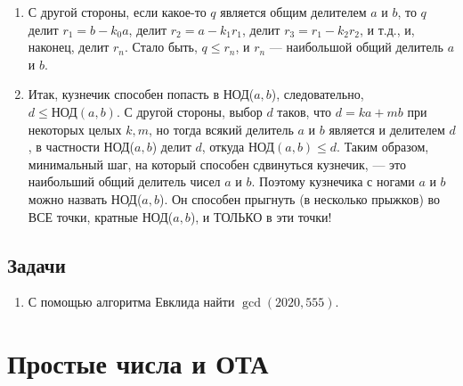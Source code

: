 \begin{enumerate}
\item С другой стороны, если какое-то $q$ является общим делителем $a$ и $b$, то $q$ делит $r_1=b-k_0a$, делит $r_2=a-k_1r_1$, делит $r_3=r_1-k_2r_2$, и т.д., и, наконец, делит $r_n$. Стало быть, $q\le r_n$, и $r_n$ --- наибольшой общий делитель $a$ и $b$.
\item Итак, кузнечик способен попасть в НОД($a,b$), следовательно, $d\le\mbox{НОД}(a,b)$. С другой стороны, выбор $d$ таков, что $d=ka+mb$ при некоторых целых $k,m$, но тогда всякий делитель $a$ и $b$ является и делителем $d$, в частности НОД($a,b$) делит $d$, откуда $\mbox{НОД}(a,b)\le d$. Таким образом, минимальный шаг, на который способен сдвинуться кузнечик, --- это наибольший общий делитель чисел $a$ и $b$. Поэтому кузнечика с ногами $a$ и $b$ можно назвать НОД($a,b$). Он способен прыгнуть (в несколько прыжков) во ВСЕ точки, кратные НОД($a,b$), и ТОЛЬКО в эти точки!
\end{enumerate}
\subsection*{Задачи}
\begin{enumerate}
\item С помощью алгоритма Евклида найти $\gcd(2020,555)$.
\end{enumerate}


\section{Простые числа и ОТА}\label{PrimeNumbers}


